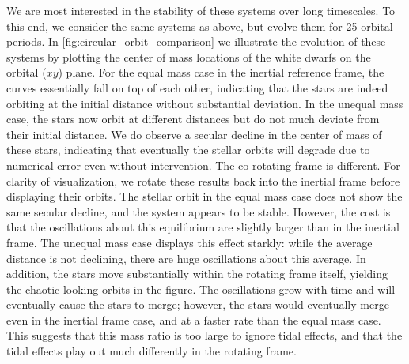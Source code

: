 \documentclass[iop]{../emulateapj}
\begin{document}
\capstartfalse

\capstarttrue

We are most interested in the stability of these systems over long timescales. To this end, we consider the same systems as above, 
but evolve them for 25 orbital periods. In \autoref{fig:circular_orbit_comparison} we illustrate the evolution of these systems 
by plotting the center of mass locations of the white dwarfs on the orbital ($xy$) plane. For the equal mass case in the inertial 
reference frame, the curves essentially fall on top of each other, indicating that the stars are indeed orbiting at the initial 
distance without substantial deviation. In the unequal mass case, the stars now orbit at different distances but do not much 
deviate from their initial distance. We do observe a secular decline in the center of mass of these stars, indicating that 
eventually the stellar orbits will degrade due to numerical error even without intervention. The co-rotating frame is different.
For clarity of visualization, we rotate these results back into the inertial frame before displaying their orbits.
The stellar orbit in the equal mass case does not show the same secular decline, and the system appears to be stable. However, 
the cost is that the oscillations about this equilibrium are slightly larger than in the inertial frame. The unequal mass case displays 
this effect starkly: while the average distance is not declining, there are huge oscillations about this average. In addition, 
the stars move substantially within the rotating frame itself, yielding the chaotic-looking orbits in the figure. The oscillations 
grow with time and will eventually cause the stars to merge; however, the stars would eventually merge even in the inertial frame 
case, and at a faster rate than the equal mass case. This suggests that this mass ratio is too large to ignore tidal effects, and 
that the tidal effects play out much differently in the rotating frame.
\end{document}
